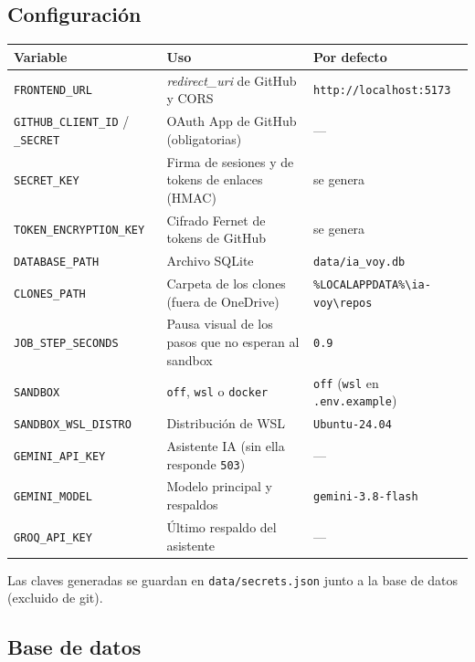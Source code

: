\documentclass[11pt,a4paper]{article}
\newcommand{\code}[1]{\texttt{\small #1}}
\newcommand{\ruta}[1]{\texttt{\small\color{branddark}#1}}
\begin{document}
\subsection{Configuración}

\begin{center}
\begin{tabularx}{\linewidth}{@{}lLl@{}}
\toprule
\textbf{Variable} & \textbf{Uso} & \textbf{Por defecto} \\
\midrule
\code{FRONTEND\_URL} & \emph{redirect\_uri} de GitHub y CORS & \code{http://localhost:5173} \\
\code{GITHUB\_CLIENT\_ID} / \code{\_SECRET} & OAuth App de GitHub (obligatorias) & --- \\
\code{SECRET\_KEY} & Firma de sesiones y de tokens de enlaces (HMAC) & se genera \\
\code{TOKEN\_ENCRYPTION\_KEY} & Cifrado Fernet de tokens de GitHub & se genera \\
\code{DATABASE\_PATH} & Archivo SQLite & \code{data/ia\_voy.db} \\
\code{CLONES\_PATH} & Carpeta de los clones (fuera de OneDrive) & \code{\%LOCALAPPDATA\%\textbackslash ia-voy\textbackslash repos} \\
\code{JOB\_STEP\_SECONDS} & Pausa visual de los pasos que no esperan al sandbox & \code{0.9} \\
\code{SANDBOX} & \code{off}, \code{wsl} o \code{docker} & \code{off} (\code{wsl} en \code{.env.example}) \\
\code{SANDBOX\_WSL\_DISTRO} & Distribución de WSL & \code{Ubuntu-24.04} \\
\code{GEMINI\_API\_KEY} & Asistente IA (sin ella responde \code{503}) & --- \\
\code{GEMINI\_MODEL} & Modelo principal y respaldos & \code{gemini-3.8-flash} \\
\code{GROQ\_API\_KEY} & Último respaldo del asistente & --- \\
\bottomrule
\end{tabularx}
\end{center}

Las claves generadas se guardan en \ruta{data/secrets.json} junto a la base de datos (excluido de git).

\subsection{Base de datos}
\end{document}
